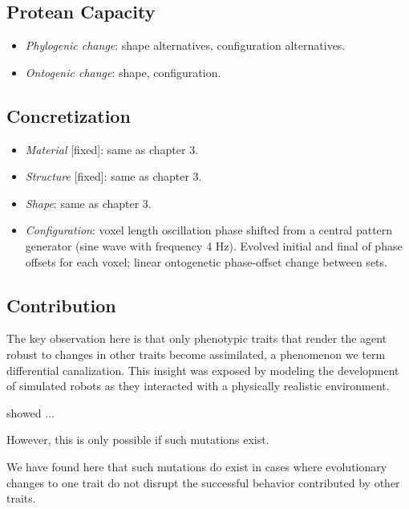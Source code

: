 \subsection{Protean Capacity}

\begin{itemize}
    \item \textit{Phylogenic change}: shape alternatives, configuration alternatives.
    \item \textit{Ontogenic change}: shape, configuration.
\end{itemize}


\subsection{Concretization}

\begin{itemize}
    \item \textit{Material} [fixed]: same as chapter 3.
    \item \textit{Structure} [fixed]: same as chapter 3.
    \item \textit{Shape}: same as chapter 3.
    \item \textit{Configuration}: voxel length oscillation phase shifted from a central pattern generator (sine wave with frequency 4 Hz).
    Evolved initial and final of phase offsets for each voxel; linear ontogenetic phase-offset change between sets.
\end{itemize}




\subsection{Contribution}


The key observation here is that only phenotypic traits that render the agent robust to changes in other traits become assimilated, a phenomenon we term differential canalization. 
This insight was exposed by modeling the development of simulated robots as they interacted with a physically realistic environment.

\citet{hinton1987learning} showed ...


However, this is only possible if such mutations exist.

We have found here that such mutations do exist in cases where evolutionary changes
to one trait do not disrupt the successful behavior contributed
by other traits.


